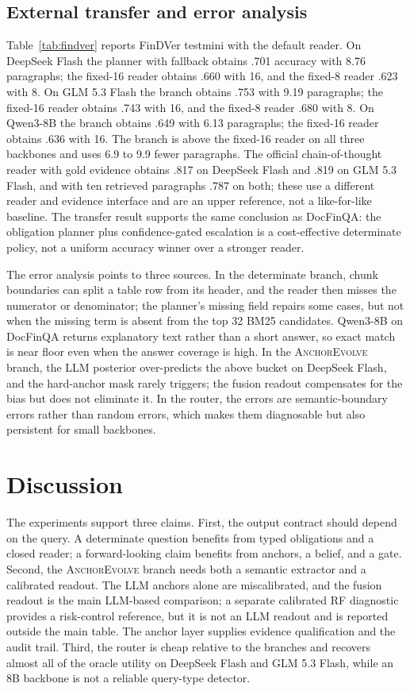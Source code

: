 \documentclass[11pt]{article}
\newcommand{\anchor}{\textsc{AnchorEvolve}}
\begin{document}
\subsection{External transfer and error analysis}
Table~\ref{tab:findver} reports FinDVer testmini with the default reader. On DeepSeek Flash the planner with fallback obtains .701 accuracy with 8.76 paragraphs; the fixed-16 reader obtains .660 with 16, and the fixed-8 reader .623 with 8. On GLM 5.3 Flash the branch obtains .753 with 9.19 paragraphs; the fixed-16 reader obtains .743 with 16, and the fixed-8 reader .680 with 8. On Qwen3-8B the branch obtains .649 with 6.13 paragraphs; the fixed-16 reader obtains .636 with 16. The branch is above the fixed-16 reader on all three backbones and uses 6.9 to 9.9 fewer paragraphs. The official chain-of-thought reader with gold evidence obtains .817 on DeepSeek Flash and .819 on GLM 5.3 Flash, and with ten retrieved paragraphs .787 on both; these use a different reader and evidence interface and are an upper reference, not a like-for-like baseline. The transfer result supports the same conclusion as DocFinQA: the obligation planner plus confidence-gated escalation is a cost-effective determinate policy, not a uniform accuracy winner over a stronger reader.

The error analysis points to three sources. In the determinate branch, chunk boundaries can split a table row from its header, and the reader then misses the numerator or denominator; the planner's missing field repairs some cases, but not when the missing term is absent from the top 32 BM25 candidates. Qwen3-8B on DocFinQA returns explanatory text rather than a short answer, so exact match is near floor even when the answer coverage is high. In the \anchor{} branch, the LLM posterior over-predicts the above bucket on DeepSeek Flash, and the hard-anchor mask rarely triggers; the fusion readout compensates for the bias but does not eliminate it. In the router, the errors are semantic-boundary errors rather than random errors, which makes them diagnosable but also persistent for small backbones.



\section{Discussion}

The experiments support three claims. First, the output contract should depend on the query. A determinate question benefits from typed obligations and a closed reader; a forward-looking claim benefits from anchors, a belief, and a gate. Second, the \anchor{} branch needs both a semantic extractor and a calibrated readout. The LLM anchors alone are miscalibrated, and the fusion readout is the main LLM-based comparison; a separate calibrated RF diagnostic provides a risk-control reference, but it is not an LLM readout and is reported outside the main table. The anchor layer supplies evidence qualification and the audit trail. Third, the router is cheap relative to the branches and recovers almost all of the oracle utility on DeepSeek Flash and GLM 5.3 Flash, while an 8B backbone is not a reliable query-type detector.
\end{document}
